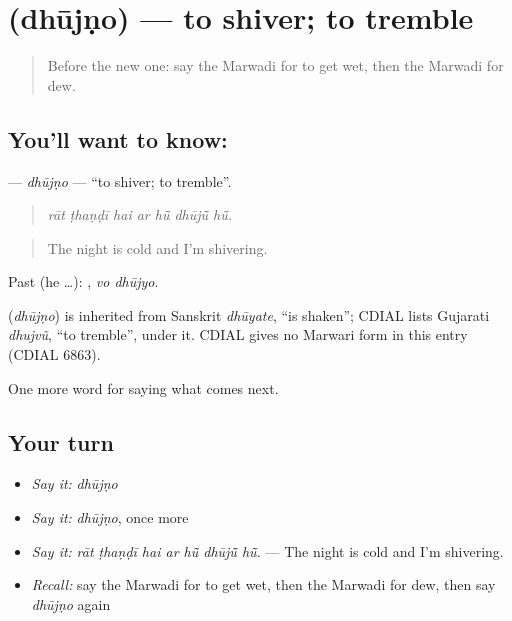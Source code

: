 \section[\texorpdfstring{\mw{धूजणो} (dhūjṇo)}{धूजणो (dhūjṇo)}]{ (dhūjṇo) — to shiver; to tremble}

\label{lesson:MW-C222-dhujno}



\begin{quote}
Before the new one: say the Marwadi for to get wet, then the Marwadi for dew.
\end{quote}

\subsection*{You'll want to know: }
\textbf{} — \emph{dhūjṇo} — \textquotedblleft{}to shiver; to tremble\textquotedblright{}.

\begin{quote}
      
\end{quote}

\begin{quote}
\emph{rāt ṭhaṇḍī hai ar hū̃ dhūjū̃ hū̃.}
\end{quote}

\begin{quote}
The night is cold and I'm shivering.
\end{quote}

Past (he …):  , \emph{vo dhūjyo}.

\begin{cousinweb}
\textbf{} (\emph{dhūjṇo}) is inherited from Sanskrit \emph{dhūyate}, \textquotedblleft{}is shaken\textquotedblright{}; CDIAL lists Gujarati \emph{dhujvũ}, \textquotedblleft{}to tremble\textquotedblright{}, under it. CDIAL gives no Marwari form in this entry (CDIAL 6863).
\end{cousinweb}

\begin{grammarlens}[title={What you've built}]
One more word for saying what comes next.
\end{grammarlens}

\subsection*{Your turn}
\begin{itemize}
\raggedright
  \item \emph{Say it:} \emph{dhūjṇo}
  \item \emph{Say it:} \emph{dhūjṇo}, once more
  \item \emph{Say it:} \emph{rāt ṭhaṇḍī hai ar hū̃ dhūjū̃ hū̃.} — The night is cold and I'm shivering.
  \item \emph{Recall:} say the Marwadi for to get wet, then the Marwadi for dew, then say \emph{dhūjṇo} again
\end{itemize}

